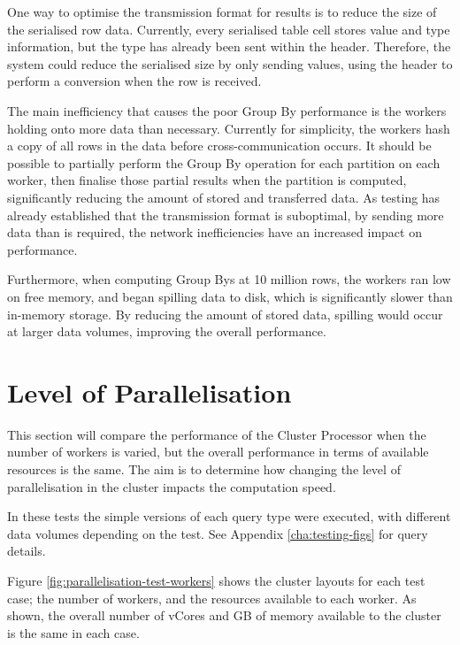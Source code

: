 One way to optimise the transmission format for results is to reduce the size of the serialised row data. Currently, every serialised table cell stores value and type information, but the type has already been sent within the header. Therefore, the system could reduce the serialised size by only sending values, using the header to perform a conversion when the row is received. 

The main inefficiency that causes the poor Group By performance is the workers holding onto more data than necessary. Currently for simplicity, the workers hash a copy of all rows in the data before cross-communication occurs. It should be possible to partially perform the Group By operation for each partition on each worker, then finalise those partial results when the partition is computed, significantly reducing the amount of stored and transferred data. As testing has already established that the transmission format is suboptimal, by sending more data than is required, the network inefficiencies have an increased impact on performance. 

Furthermore, when computing Group Bys at 10 million rows, the workers ran low on free memory, and began spilling data to disk, which is significantly slower than in-memory storage. By reducing the amount of stored data, spilling would occur at larger data volumes, improving the overall performance.



\section{Level of Parallelisation}\label{sec:parallelisation-test}
This section will compare the performance of the Cluster Processor when the number of workers is varied, but the overall performance in terms of available resources is the same. The aim is to determine how changing the level of parallelisation in the cluster impacts the computation speed. 

In these tests the simple versions of each query type were executed, with different data volumes depending on the test. See Appendix \ref{cha:testing-figs} for query details. 

Figure \ref{fig:parallelisation-test-workers} shows the cluster layouts for each test case; the number of workers, and the resources available to each worker. As shown, the overall number of vCores and GB of memory available to the cluster is the same in each case. 


